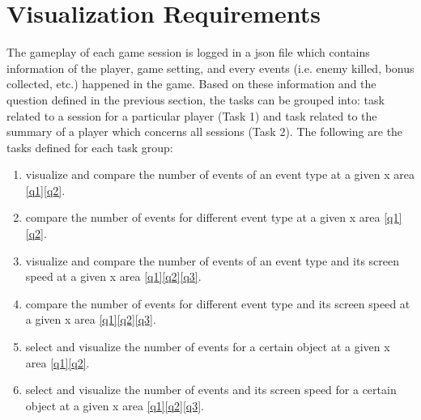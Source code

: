 \section{Visualization Requirements}

The gameplay of each game session is logged in a json file which contains information of the player, game setting, and every events (i.e. enemy killed, bonus collected, etc.) happened in the game. Based on these information and the question defined in the previous section, the tasks can be grouped into: task related to a session for a particular player (Task 1) and task related to the summary of a player which concerns all sessions (Task 2). The following are the tasks defined for each task group:
\newcommand{\task}[2]{$#1 #2$}
\begin{enumerate}[label=\textbf{(\task{T1.}{\arabic*})}]
\item \label{t11} visualize and compare the number of events of an event type at a given x area \ref{q1}\ref{q2}.
\item \label{t12} compare the number of events for different event type at a given x area  \ref{q1}\ref{q2}.
\item \label{t13} visualize and compare the number of events of an event type and its screen speed at a given x area \ref{q1}\ref{q2}\ref{q3}.
\item \label{t14} compare the number of events for different event type and its screen speed at a given x area \ref{q1}\ref{q2}\ref{q3}.
\item \label{t15} select and visualize the number of events for a certain object at a given x area \ref{q1}\ref{q2}.
\item \label{t16} select and visualize the number of events and its screen speed for a certain object at a given x area \ref{q1}\ref{q2}\ref{q3}.
\end{enumerate}

